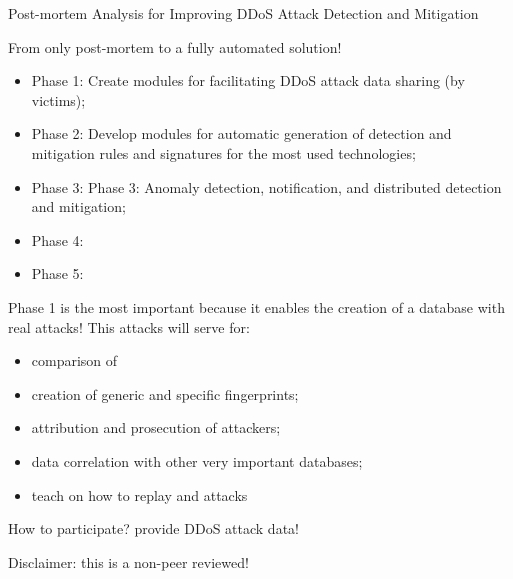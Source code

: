 Post-mortem Analysis for Improving DDoS Attack Detection and Mitigation


From only post-mortem to a fully automated solution!

\begin{itemize}
	\item Phase 1: Create modules for facilitating DDoS attack data sharing (by victims);
	\item Phase 2: Develop modules for automatic generation of detection and mitigation rules and signatures for the most used technologies;
	\item Phase 3: Phase 3: Anomaly detection, notification, and distributed detection and mitigation;
	\item Phase 4:
	\item Phase 5:
\end{itemize}

Phase 1 is the most important because it enables the creation of a database with real attacks! This attacks will serve for:
\begin{itemize}
	\item comparison of 
	\item creation of generic and specific fingerprints;
	\item attribution and prosecution of attackers;
	\item data correlation with other very important databases;
	\item teach on how to replay and attacks
\end{itemize}


How to participate?
provide DDoS attack data!


Disclaimer: this is a non-peer reviewed!